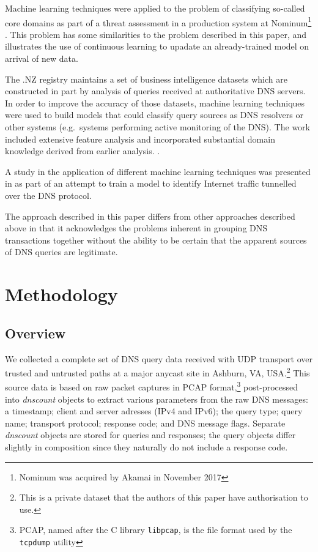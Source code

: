 \documentclass[conference]{IEEEtran}
\let\citep\cite
\begin{document}
Machine learning techniques were applied to the problem of classifying
so-called core domains as part of a threat assessment in a production
system at
Nominum\footnote{Nominum was acquired by Akamai in November 2017}
\citep{Yuzifovichbotconf2017} \citep{YuzifovichOARC2017}. This problem
has some similarities to the problem described in this paper, and
illustrates the use of continuous learning to upadate an already-trained
model on arrival of new data.

The .NZ registry maintains a set of business intelligence datasets which
are constructed in part by analysis of queries received at authoritative
DNS servers. In order to improve the accuracy of those datasets, machine
learning techniques were used to build models that could classify query
sources as DNS resolvers or other systems (e.g.~systems performing
active monitoring of the DNS). The work included extensive feature
analysis and incorporated substantial domain knowledge derived from
earlier analysis. \citep{Qiao2018} \citep{QiaoOARC2018}.

A study in the application of different machine learning techniques was
presented in \citep{Sammour2017} as part of an attempt to train a model
to identify Internet traffic tunnelled over the DNS protocol.

The approach described in this paper differs from other approaches
described above in that it acknowledges the problems inherent in
grouping DNS transactions together without the ability to be certain
that the apparent sources of DNS queries are legitimate.

\section{Methodology}\label{sec:methodology}

\label{sec:methodology}

\subsection{Overview}\label{sec:overview}

\label{sec:methodology_overview} We collected a complete set of DNS
query data received with UDP transport over trusted and untrusted paths
at a major anycast site in Ashburn, VA,
USA.\footnote{This is a private dataset that the authors of this paper have authorisation to use.}
This source data is based on raw packet captures in PCAP
format,\footnote{PCAP, named after the C library \texttt{libpcap}, is the file format used by the \texttt{tcpdump} utility}
post-processed into \emph{dnscount} objects to extract various
parameters from the raw DNS messages: a timestamp; client and server
adresses (IPv4 and IPv6); the query type; query name; transport
protocol; response code; and DNS message flags. Separate \emph{dnscount}
objects are stored for queries and responses; the query objects differ
slightly in composition since they naturally do not include a response
code.
\end{document}
